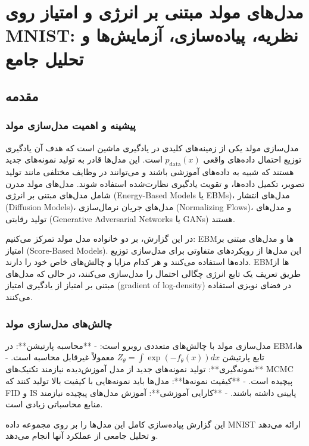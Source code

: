 
\def \Subject {مدل‌های مولد مبتنی بر انرژی و امتیاز روی MNIST: نظریه، پیاده‌سازی، آزمایش‌ها و تحلیل جامع}
\def \Session { یک}
\renewcommand{\chaptername}{سوال}
\chapter{\Subject}

\section{مقدمه}
\subsection{پیشینه و اهمیت مدل‌سازی مولد}
مدل‌سازی مولد یکی از زمینه‌های کلیدی در یادگیری ماشین است که هدف آن یادگیری توزیع احتمال داده‌های واقعی \( p_{\text{data}}(x) \) است. این مدل‌ها قادر به تولید نمونه‌های جدید هستند که شبیه به داده‌های آموزشی باشند و می‌توانند در وظایف مختلفی مانند تولید تصویر، تکمیل داده‌ها، و تقویت یادگیری نظارت‌شده استفاده شوند. مدل‌های مولد مدرن شامل مدل‌های مبتنی بر انرژی (Energy-Based Models یا EBMs)، مدل‌های انتشار (Diffusion Models)، مدل‌های جریان نرمال‌سازی (Normalizing Flows)، و مدل‌های تولید رقابتی (Generative Adversarial Networks یا GANs) هستند.

در این گزارش، بر دو خانواده مدل مولد تمرکز می‌کنیم: EBMها و مدل‌های مبتنی بر امتیاز (Score-Based Models). این مدل‌ها از رویکردهای متفاوتی برای مدل‌سازی توزیع داده‌ها استفاده می‌کنند و هر کدام مزایا و چالش‌های خاص خود را دارند. EBMها از طریق تعریف یک تابع انرژی چگالی احتمال را مدل‌سازی می‌کنند، در حالی که مدل‌های مبتنی بر امتیاز از یادگیری امتیاز (gradient of log-density) در فضای نویزی استفاده می‌کنند.

\subsection{چالش‌های مدل‌سازی مولد}
مدل‌سازی مولد با چالش‌های متعددی روبرو است:
- **محاسبه پارتیشن**: در EBMها، تابع پارتیشن \( Z_\theta = \int \exp(-f_\theta(x)) dx \) معمولاً غیرقابل محاسبه است.
- **نمونه‌گیری**: تولید نمونه‌های جدید از مدل آموزش‌دیده نیازمند تکنیک‌های MCMC پیچیده است.
- **کیفیت نمونه‌ها**: مدل‌ها باید نمونه‌هایی با کیفیت بالا تولید کنند که FID و IS پایینی داشته باشند.
- **کارایی آموزشی**: آموزش مدل‌های پیچیده نیازمند منابع محاسباتی زیادی است.

این گزارش پیاده‌سازی کامل این مدل‌ها را بر روی مجموعه داده MNIST ارائه می‌دهد و تحلیل جامعی از عملکرد آنها انجام می‌دهد.

